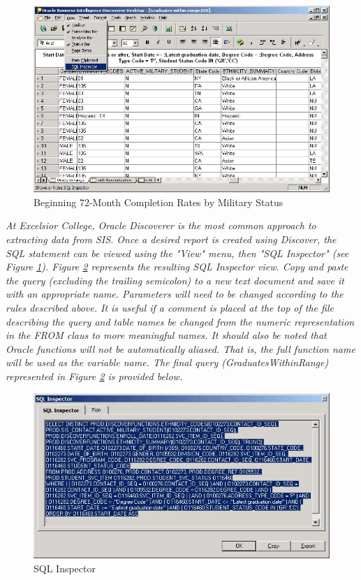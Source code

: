 \documentclass[letterpaper,11pt]{article}
\begin{document}
\begin{figure}[h]
\begin{center}
\includegraphics{DiscovererMenu}
\caption{Beginning 72-Month Completion Rates by Military Status}
\label{fig:discoverer}
\end{center}
\end{figure}

\textit{At Excelsior College, Oracle Discoverer is the most common approach to extracting data from SIS. Once a desired report is created using Discover, the SQL statement can be viewed using the "View" menu, then "SQL Inspector" (see Figure \ref{fig:discoverer}). Figure \ref{fig:sqlinspector} represents the resulting SQL Inspector view. Copy and paste the query (excluding the trailing semicolon) to a new text document and save it with an appropriate name. Parameters will need to be changed according to the rules described above. It is useful if a comment is placed at the top of the file describing the query and table names be changed from the numeric representation in the FROM claus to more meaningful names. It should also be noted that Oracle functions will not be automatically aliased. That is, the full function name will be used as the variable name. The final query (GraduatesWithinRange) represented in Figure \ref{fig:sqlinspector} is provided below.}

\begin{figure}[h]
\begin{center}
\includegraphics{SQLInspector}
\caption{SQL Inspector}
\label{fig:sqlinspector}
\end{center}
\end{figure}
\end{document}
